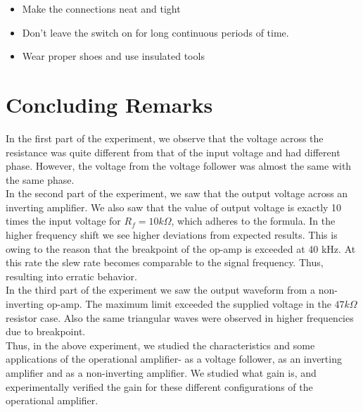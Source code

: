 \documentclass{article}
\begin{document}
\begin{itemize}
\item Make the connections neat and tight
\item Don’t leave the switch on for long continuous periods of time.
\item Wear proper shoes and use insulated tools
\end{itemize}

\vspace{5px}

\section{Concluding Remarks}
In the first part of the experiment, we observe that the voltage across the resistance was quite different from that of the input voltage and had different phase. However, the voltage from the voltage follower was almost the same with the same phase. \\

In the second part of the experiment, we saw that the output voltage across an inverting amplifier. We also saw that the value of output voltage is exactly 10 times the input voltage for $R_f = 10k\Omega$, which adheres to the formula. In the higher frequency shift we see higher deviations from expected results. This is owing to the reason that the breakpoint of the op-amp is exceeded at 40 kHz. At this rate the slew rate becomes comparable to the signal frequency. Thus, resulting into erratic behavior. \\

In the third part of the experiment we saw the output waveform from a non-inverting op-amp. The maximum limit exceeded the supplied voltage in the $47 k\Omega$ resistor case. Also the same triangular waves were observed in higher frequencies due to breakpoint. \\

Thus, in the above experiment, we studied the characteristics and some applications of the operational amplifier- as a voltage follower, as an inverting amplifier and as a non-inverting amplifier. We studied what gain is, and experimentally verified the gain for these different configurations of the operational amplifier.
\end{document}
